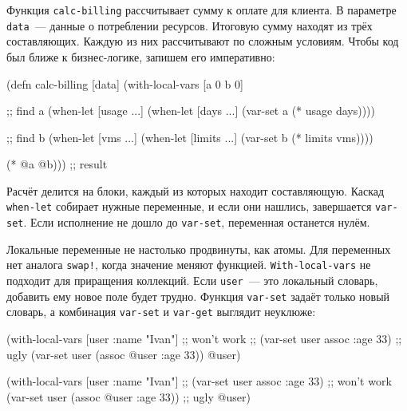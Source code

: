 Функция \verb|calc-billing| рассчитывает сумму к оплате для клиента. В параметре
\verb|data|~--- данные о потреблении ресурсов. Итоговую сумму находят из трёх
составляющих. Каждую из них рассчитывают по сложным условиям. Чтобы код был
ближе к бизнес-логике, запишем его императивно:

\begin{english}
  \begin{clojure}
(defn calc-billing [data]
  (with-local-vars [a 0 b 0]

    ;; find a
    (when-let [usage ...]
      (when-let [days ...]
        (var-set a (* usage days))))

    ;; find b
    (when-let [vms ...]
      (when-let [limits ...]
        (var-set b (* limits vms))))

    (* @a @b))) ;; result
  \end{clojure}
\end{english}

Расчёт делится на блоки, каждый из которых находит составляющую. Каскад
\verb|when-let| собирает нужные переменные, и если они нашлись, завершается
\verb|var-set|. Если исполнение не дошло до \verb|var-set|, переменная останется
нулём.

Локальные переменные не настолько продвинуты, как атомы. Для переменных нет
аналога \verb|swap!|, когда значение меняют функцией. \verb|With-local-vars| не
подходит для приращения коллекций. Если \verb|user|~--- это локальный словарь,
добавить ему новое поле будет трудно. Функция \verb|var-set| задаёт только новый
словарь, а комбинация \verb|var-set| и \verb|var-get| выглядит неуклюже:

\ifnarrow

\begin{english}
  \begin{clojure}
(with-local-vars [user {:name "Ivan"}]
  ;; won't work
  ;; (var-set user assoc :age 33)
  ;; ugly
  (var-set user (assoc @user :age 33))
  @user)
  \end{clojure}
\end{english}

\else

\begin{english}
  \begin{clojure}
(with-local-vars [user {:name "Ivan"}]
  ;; (var-set user assoc :age 33) ;; won't work
  (var-set user (assoc @user :age 33)) ;; ugly
  @user)
  \end{clojure}
\end{english}

